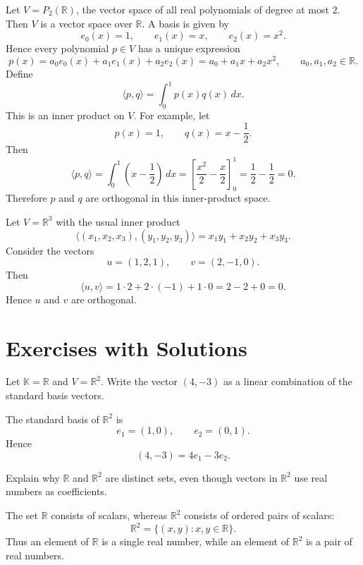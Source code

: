 \documentclass{article}
\begin{document}
\begin{example}
Let $V=P_2(\mathbb{R})$, the vector space of all real polynomials of degree at most $2$. Then $V$ is a vector space over $\mathbb{R}$. A basis is given by
$$
e_0(x)=1,\qquad e_1(x)=x,\qquad e_2(x)=x^2.
$$
Hence every polynomial $p\in V$ has a unique expression
$$
p(x)=a_0e_0(x)+a_1e_1(x)+a_2e_2(x)
=a_0+a_1x+a_2x^2,
\qquad a_0,a_1,a_2\in\mathbb{R}.
$$
Define
$$
\langle p,q\rangle=\int_{0}^{1} p(x)q(x)\,dx.
$$
This is an inner product on $V$. For example, let
$$
p(x)=1,\qquad q(x)=x-\frac12.
$$
Then
$$
\langle p,q\rangle=\int_0^1 \left(x-\frac12\right)\,dx
=\left[\frac{x^2}{2}-\frac{x}{2}\right]_0^1
=\frac12-\frac12=0.
$$
Therefore $p$ and $q$ are orthogonal in this inner-product space.
\end{example}

\begin{example}
Let $V=\mathbb{R}^3$ with the usual inner product
$$
\langle (x_1,x_2,x_3),(y_1,y_2,y_3)\rangle=x_1y_1+x_2y_2+x_3y_3.
$$
Consider the vectors
$$
u=(1,2,1),\qquad v=(2,-1,0).
$$
Then
$$
\langle u,v\rangle=1\cdot 2+2\cdot(-1)+1\cdot 0=2-2+0=0.
$$
Hence $u$ and $v$ are orthogonal.
\end{example}

\section{Exercises with Solutions}

\begin{exercise}
Let $\mathbb{K}=\mathbb{R}$ and $V=\mathbb{R}^2$. Write the vector $(4,-3)$ as a linear combination of the standard basis vectors.
\end{exercise}

\begin{solution}
The standard basis of $\mathbb{R}^2$ is
$$
e_1=(1,0),\qquad e_2=(0,1).
$$
Hence
$$
(4,-3)=4e_1-3e_2.
$$
\end{solution}

\begin{exercise}
Explain why $\mathbb{R}$ and $\mathbb{R}^2$ are distinct sets, even though vectors in $\mathbb{R}^2$ use real numbers as coefficients.
\end{exercise}

\begin{solution}
The set $\mathbb{R}$ consists of scalars, whereas $\mathbb{R}^2$ consists of ordered pairs of scalars:
$$
\mathbb{R}^2=\{(x,y):x,y\in\mathbb{R}\}.
$$
Thus an element of $\mathbb{R}$ is a single real number, while an element of $\mathbb{R}^2$ is a pair of real numbers.
\end{solution}
\end{document}
